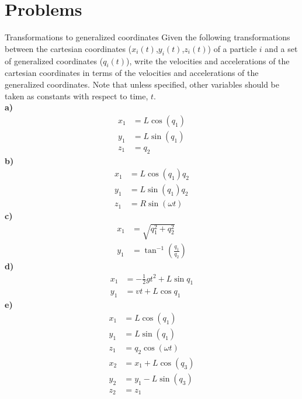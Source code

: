 %
\section{Problems}
\begin{problem}{Transformations to generalized coordinates}
\label{prob_Intro_1}
Given the following transformations between the cartesian coordinates ($x_i(t)$,$y_i(t)$,$z_i(t)$) of a particle $i$ and a set of generalized coordinates ($q_i(t)$), write the velocities and accelerations of the cartesian coordinates in terms of the velocities and accelerations of the generalized coordinates. Note that unless specified, other variables should be taken as constants with respect to time, $t$.\\
\textbf{a)}
 \begin{align*}
x_1&=L\cos(q_1)\\
y_1&=L\sin(q_1)\\
z_1&=q_2
\end{align*}
\textbf{b)}
\begin{align*}
x_1&=L\cos(q_1)q_2\\
y_1&=L\sin(q_1)q_2\\
z_1&=R\sin(\omega t)
\end{align*}
\textbf{c)}
\begin{align*}
x_1&=\sqrt{q_1^2+q_2^2}\\
y_1&=\tan^{-1}\left(\frac{q_1}{q_2}\right)
\end{align*}
\textbf{d)}
\begin{align*}
x_1&=-\frac{1}{2}gt^2+L\sin{q_1}\\
y_1&=vt+L\cos{q_1}
\end{align*}
\textbf{e)}
\begin{align*}
x_1&=L\cos(q_1)\\
y_1&=L\sin(q_1)\\
z_1&=q_2 \cos(\omega t)\\
x_2&=x_1+L\cos(q_3)\\
y_2&=y_1-L\sin(q_3)\\
z_2&=z_1
\end{align*}
\end{problem}
